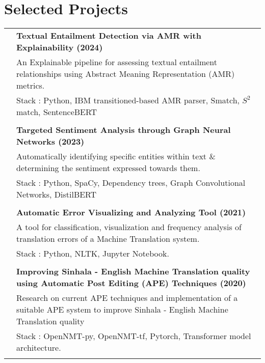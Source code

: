 \documentclass[a4paper,11pt]{article}
\begin{document}
\section{Selected Projects}
\begin{supertabular}{r|p{17.5cm}}
\emph{} & \normalsize \bf Textual Entailment Detection via AMR with Explainability (2024) \textsc{}  \\\textsc{}&\small{An Explainable pipeline for assessing textual entailment relationships using Abstract Meaning Representation (AMR) metrics.}\\&\footnotesize{Stack : Python, IBM transitioned-based AMR parser, Smatch, \(S^2\)match, SentenceBERT}\\ \\

\emph{} & \normalsize \bf Targeted Sentiment Analysis through Graph Neural Networks (2023) \textsc{}  \\\textsc{}&\small{Automatically identifying specific entities within text \& determining the sentiment expressed towards them.}\\&\footnotesize{Stack : Python, SpaCy,  Dependency trees, Graph Convolutional Networks, DistilBERT}\\ \\

 \emph{} & \normalsize \bf Automatic Error Visualizing and Analyzing Tool (2021) \textsc{}  \\\textsc{}&\small{A tool for classification, visualization and frequency analysis of translation errors of a Machine Translation system.}\\&\footnotesize{Stack : Python, NLTK, Jupyter Notebook.}\\ \\
 \emph{} & \normalsize \bf Improving Sinhala - English Machine Translation quality using Automatic Post Editing (APE) Techniques (2020)\textsc{}  \\\textsc{}&\small{Research  on current APE techniques and implementation of a suitable APE system to improve Sinhala - English Machine Translation quality}\\&\footnotesize{Stack : OpenNMT-py, OpenNMT-tf, Pytorch, Transformer model architecture.}\\ \\
 


\end{supertabular}
\end{document}
